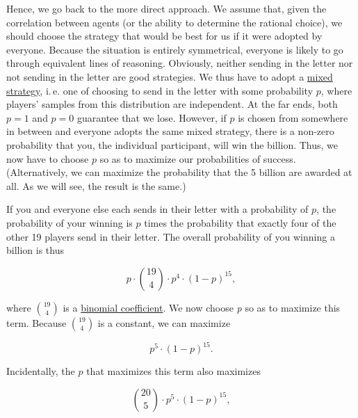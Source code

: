 Hence, we go back to the more direct approach. We assume that, given the
correlation between agents (or the ability to determine the rational
choice), we should choose the strategy that would be best for us if it
were adopted by everyone. Because the situation is entirely symmetrical,
everyone is likely to go through equivalent lines of reasoning.
Obviously, neither sending in the letter nor not sending in the letter
are good strategies. We thus have to adopt a
\href{https://en.wikipedia.org/wiki/Strategy_(game_theory)\#Pure_and_mixed_strategies}{mixed
strategy}, i.\,e. one of choosing to send in the letter with some
probability \(p\), where players' samples from this distribution are
independent. At the far ends, both \(p = 1\) and \(p = 0\) guarantee
that we lose. However, if \(p\) is chosen from somewhere in between and
everyone adopts the same mixed strategy, there is a non-zero probability
that you, the individual participant, will win the billion. Thus, we now
have to choose \(p\) so as to maximize our probabilities of success.
(Alternatively, we can maximize the probability that the 5 billion are
awarded at all. As we will see, the result is the same.)

If you and everyone else each sends in their letter with a probability
of \(p\), the probability of your winning is \(p\) times the probability
that exactly four of the other 19 players send in their letter. The
overall probability of you winning a billion is thus

\begin{equation}
    p \cdot \binom{19}{4} \cdot p^{4} \cdot (1 - p)^{15},
    \label{eq:billion}
\end{equation}

where $\binom{19}{4}$ is a
\href{https://en.wikipedia.org/wiki/Binomial_coefficient}{binomial
coefficient}. We now choose \emph{p} so as to maximize this term.
Because $\binom{19}{4}$ is a constant, we can maximize

\begin{equation}
    p^{5} \cdot (1 - p)^{15}.
    \label{eq:max_p}
\end{equation}

Incidentally, the \(p\) that maximizes this term also maximizes

\begin{equation}
    \binom{20}{5} \cdot p^{5} \cdot (1 - p)^{15},
    \label{eq:max_p_2}
\end{equation}

